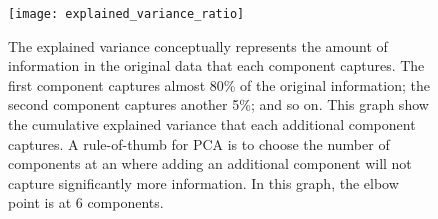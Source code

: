\begin{figure}
\texttt{[image: explained\_variance\_ratio]}
\caption[Explained Variance Ratio]{The explained variance conceptually represents the amount of information in the original data that each component captures. The first component captures almost 80\% of the original information; the second component captures another 5\%; and so on. This graph show the cumulative explained variance that each additional component captures. A rule-of-thumb for PCA is to choose the number of components at an  where adding an additional component will not capture significantly more information. In this graph, the elbow point is at 6 components.}
\label{fig:ctm-num-components}
\end{figure}




